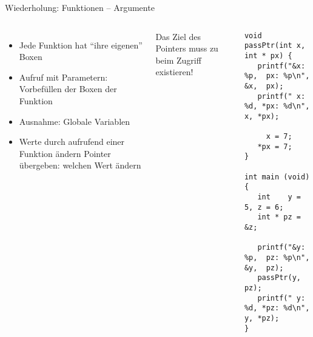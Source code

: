 \begin{frame}[fragile]{Wiederholung: Funktionen -- Argumente}
%
\begin{columns}[T]
\begin{itemize}
\item Jede Funktion hat \enquote{ihre eigenen} Boxen
\item Aufruf mit Parametern: Vorbefüllen der Boxen der Funktion
\item Ausnahme: Globale Variablen
\item Werte durch aufrufend einer Funktion ändern \newline
	\Thus Pointer übergeben: welchen Wert ändern
\end{itemize}
%
\begin{warnbox}
\small
Das Ziel des Pointers muss zu beim Zugriff existieren!
\end{warnbox}
%
\vspace{-10pt}
\begin{codebox}
\begin{verbatim}
void passPtr(int x, int * px) {
   printf("&x: %p,  px: %p\n", &x,  px);
   printf(" x: %d, *px: %d\n",  x, *px);
   
     x = 7;
   *px = 7;
}

int main (void) {
   int    y = 5, z = 6;
   int * pz = &z;
   
   printf("&y: %p,  pz: %p\n", &y,  pz);
   passPtr(y, pz);
   printf(" y: %d, *pz: %d\n",  y, *pz);
}
\end{verbatim}
\end{codebox}
\end{columns}

%
\end{frame}


